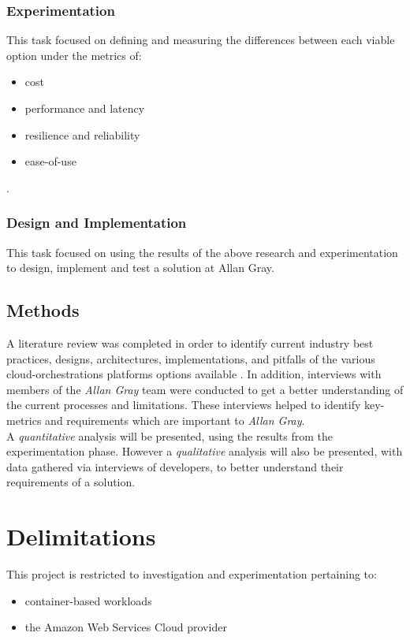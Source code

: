 \subsection{Experimentation}
This task focused on defining and measuring the differences between each viable option under the metrics of:
\begin{itemize}
  \item cost
  \item performance and latency
  \item resilience and reliability
  \item ease-of-use
\end{itemize}.
\subsection{Design and Implementation}
This task focused on using the results of the above research and experimentation to design, implement and test a solution at Allan Gray.

\section{Methods}
A literature review was completed in order to identify current industry best practices, designs, architectures, implementations, and
pitfalls of the various cloud-orchestrations platforms options available .
In addition, interviews with members of the \textit{Allan Gray} team were conducted to get a better understanding of the current processes and limitations.
These interviews helped to identify key-metrics and requirements which are important to \textit{Allan Gray}. \\

\noindent A \textit{quantitative} analysis will be presented, using the results from the experimentation phase.
However a \textit{qualitative} analysis will also be presented, with data gathered via interviews of developers, to better understand their requirements of a solution.

\chapter{Delimitations}
This project is restricted to investigation and experimentation pertaining to:
\begin{itemize}
  \item container-based workloads
  \item the Amazon Web Services Cloud provider
\end{itemize}

